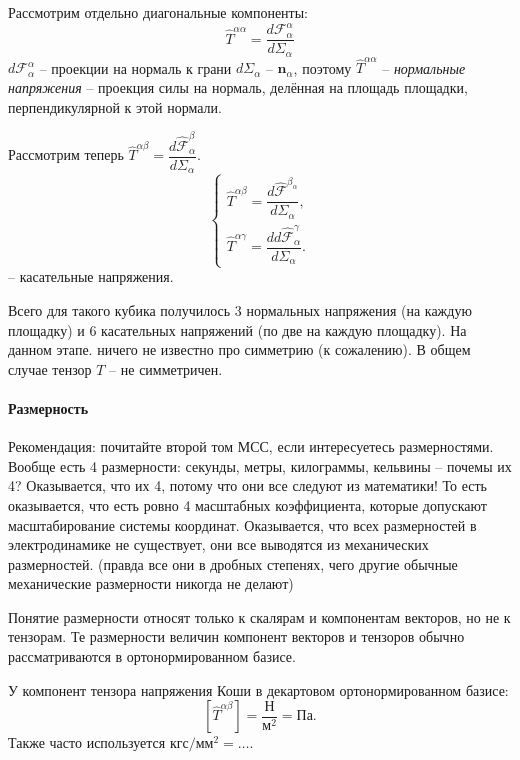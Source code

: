 Рассмотрим отдельно диагональные компоненты:
\[
  \hat{T}^{\alpha \alpha} = \dfrac{d\mathbf{\mathcal{F}}^\alpha_\alpha}{d\Sigma_\alpha}
\]
$d\mathbf{\mathcal{F}}^\alpha_\alpha$ -- проекции на нормаль к грани $d\Sigma_\alpha$
-- $\mathbf{n}_\alpha$, поэтому $\hat{T}^{\alpha\alpha}$ -- \emph{нормальные напряжения}
-- проекция силы на нормаль, делённая на площадь площадки, перпендикулярной 
к этой нормали.


Рассмотрим теперь $\hat{T}^{\alpha\beta} = \dfrac{d\hat{\mathbf{\mathcal{F}}}^\beta_\alpha}{d\Sigma_\alpha}$.
\[
  \begin{cases}
    \hat{T}^{\alpha\beta} = \dfrac{d\hat{\mathbf{\mathcal{F}}}^{\beta_\alpha}}{d\Sigma_\alpha},\\
    \hat{T}^{\alpha\gamma} = \dfrac{dd\hat{\mathbf{\mathcal{F}}}^{\gamma}_\alpha}{d\Sigma_\alpha}.
  \end{cases}
\]
-- касательные напряжения.

Всего для такого кубика получилось
3 нормальных напряжения (на каждую площадку) и 6 касательных напряжений (по две
на каждую площадку). На данном этапе. ничего не известно про симметрию (к сожалению).
В общем случае тензор $T$ -- не симметричен.

\paragraph{Размерность}
Рекомендация: почитайте второй том МСС, если интересуетесь размерностями.
Вообще есть 4 размерности: секунды, метры, килограммы, кельвины -- почемы их 4?
Оказывается, что их 4, потому что они все следуют из математики! То есть
оказывается, что есть ровно 4 масштабных коэффициента, которые допускают 
масштабирование системы координат. Оказывается, что всех размерностей 
в электродинамике не существует, они все выводятся из механических размерностей.
(правда все они в дробных степенях, чего другие обычные механические размерности
никогда не делают)

Понятие размерности относят только к скалярам и компонентам векторов, но не к тензорам.
Те размерности величин компонент векторов и тензоров обычно рассматриваются в 
ортонормированном базисе.

У компонент тензора напряжения Коши в декартовом ортонормированном базисе:
\[
  \left[ \hat{T}^{\alpha\beta} \right] = \dfrac{\text{Н}}{\text{м}^2} = \text{Па}.
\]
Также часто используется $\text{кгс} / \text{мм}^2 = \dots$.


